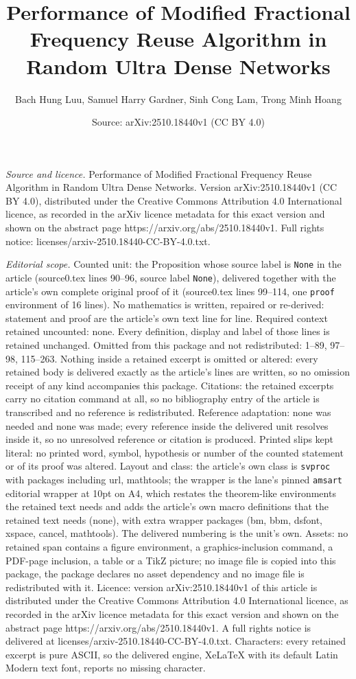 \documentclass[10pt,a4paper]{amsart}
\title[Performance of Modified Fractional Frequency Reuse Algorithm]{Performance of Modified Fractional Frequency Reuse Algorithm in Random Ultra Dense Networks}
\author{Bach Hung Luu, Samuel Harry Gardner, Sinh Cong Lam, Trong Minh Hoang}
\date{Source: arXiv:2510.18440v1 (CC BY 4.0)}
\begin{document}
\maketitle

\noindent\emph{Source and licence.} Performance of Modified Fractional Frequency Reuse Algorithm in Random Ultra Dense Networks. Version arXiv:2510.18440v1 (CC BY 4.0), distributed under the Creative Commons Attribution 4.0 International licence, as recorded in the arXiv licence metadata for this exact version and shown on the abstract page https://arxiv.org/abs/2510.18440v1. Full rights notice: licenses/arxiv-2510.18440-CC-BY-4.0.txt.\par\smallskip

\noindent\textit{Editorial scope.} Counted unit: the Proposition whose source label is \texttt{None} in the article (source0.tex lines 90--96, source label \texttt{None}), delivered together with the article's own complete original proof of it (source0.tex lines 99--114, one \texttt{proof} environment of 16 lines). No mathematics is written, repaired or re-derived: statement and proof are the article's own text line for line. Required context retained uncounted: none. Every definition, display and label of those lines is retained unchanged. Omitted from this package and not redistributed: 1--89, 97--98, 115--263. Nothing inside a retained excerpt is omitted or altered: every retained body is delivered exactly as the article's lines are written, so no omission receipt of any kind accompanies this package. Citations: the retained excerpts carry no citation command at all, so no bibliography entry of the article is transcribed and no reference is redistributed. Reference adaptation: none was needed and none was made; every reference inside the delivered unit resolves inside it, so no unresolved reference or citation is produced. Printed slips kept literal: no printed word, symbol, hypothesis or number of the counted statement or of its proof was altered. Layout and class: the article's own class is \texttt{svproc} with packages including url, mathtools; the wrapper is the lane's pinned \texttt{amsart} editorial wrapper at 10pt on A4, which restates the theorem-like environments the retained text needs and adds the article's own macro definitions that the retained text needs (none), with extra wrapper packages (bm, bbm, dsfont, xspace, cancel, mathtools). The delivered numbering is the unit's own. Assets: no retained span contains a figure environment, a graphics-inclusion command, a PDF-page inclusion, a table or a TikZ picture; no image file is copied into this package, the package declares no asset dependency and no image file is redistributed with it. Licence: version arXiv:2510.18440v1 of this article is distributed under the Creative Commons Attribution 4.0 International licence, as recorded in the arXiv licence metadata for this exact version and shown on the abstract page https://arxiv.org/abs/2510.18440v1. A full rights notice is delivered at licenses/arxiv-2510.18440-CC-BY-4.0.txt. Characters: every retained excerpt is pure ASCII, so the delivered engine, XeLaTeX with its default Latin Modern text font, reports no missing character.
\end{document}
